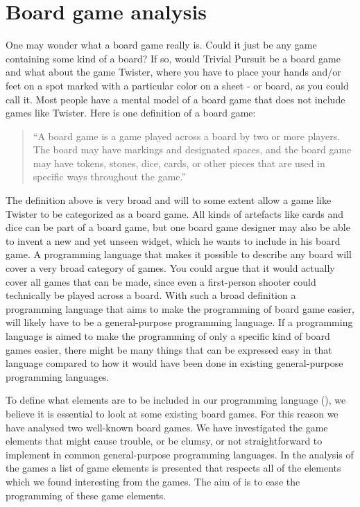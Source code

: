 \section{Board game analysis}
\label{sec:board-game-analysis}

One may wonder what a board game really is. Could it just be any game containing
some kind of a board? If so, would Trivial Pursuit be a board game and what
about the game Twister, where you have to place your hands and/or feet on a spot
marked with a particular color on a sheet - or board, as you could call it. Most
people have a mental model of a board game that does not include games like
Twister. Here is one definition of a board game:

\begin{quote}
  ``A board game is a game played across a board by two or more players. The
  board may have markings and designated spaces, and the board game may have
  tokens, stones, dice, cards, or other pieces that are used in specific ways
  throughout the game.''
  \cite{def-board-game}
\end{quote}

The definition above is very broad and will to some extent allow a game like
Twister to be categorized as a board game. All kinds of artefacts like cards and
dice can be part of a board game, but one board game designer may also be able
to invent a new and yet unseen widget, which he wants to include in his board
game. A programming language that makes it possible to describe any board will
cover a very broad category of games. You could argue that it would actually
cover all games that can be made, since even a first-person shooter could
technically be played across a board. With such a broad definition a
programming language that aims to make the programming of board game easier,
will likely have to be a general-purpose programming language. If a programming
language is aimed to make the programming of only a specific kind of board games
easier, there might be many things that can be expressed easy in that language
compared to how it would have been done in existing general-purpose programming
languages.

To define what elements are to be included in our programming language
(\productname{}), we believe it is essential to look at some existing board
games.  For this reason we have analysed two well-known board games. We have
investigated the game elements that might cause trouble, or be clumsy, or not
straightforward to implement in common general-purpose programming languages. In
the analysis of the games a list of game elements is presented that respects all
of the elements which we found interesting from the games. The aim of
\productname{} is to ease the programming of these game elements.

